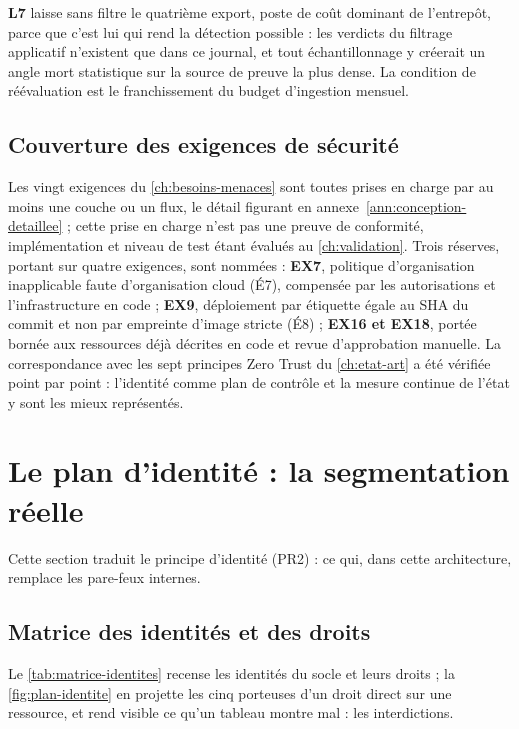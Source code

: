 \textbf{L7} laisse sans filtre le quatrième export, poste de coût dominant de l'entrepôt, parce que
c'est lui qui rend la détection possible : les verdicts du filtrage applicatif n'existent que dans ce
journal, et tout échantillonnage y créerait un angle mort statistique sur la source de preuve la plus
dense. La condition de réévaluation est le franchissement du budget d'ingestion mensuel.

\subsection{Couverture des exigences de sécurité}
\label{sec:couverture-exigences}

Les vingt exigences du \cref{ch:besoins-menaces} sont toutes prises en charge par au moins une couche ou un flux,
le détail figurant en annexe~\ref{ann:conception-detaillee} ; cette prise en charge n'est pas une
preuve de conformité, implémentation et niveau de test étant évalués au \cref{ch:validation}. Trois réserves,
portant sur quatre exigences, sont nommées : \textbf{EX7}, politique d'organisation inapplicable
faute d'organisation cloud (É7), compensée par les autorisations et l'infrastructure en code ;
\textbf{EX9}, déploiement par étiquette égale au SHA du commit et non par empreinte d'image stricte
(É8) ; \textbf{EX16 et EX18}, portée bornée aux ressources déjà décrites en code et revue
d'approbation manuelle. La correspondance avec les sept principes Zero Trust du \cref{ch:etat-art} a été
vérifiée point par point : l'identité comme plan de contrôle et la mesure continue de l'état y sont
les mieux représentés.

\section{Le plan d'identité : la segmentation réelle}
\label{sec:plan-identite}

Cette section traduit le principe d'identité (PR2) : ce qui, dans cette architecture, remplace les
pare-feux internes.

\subsection{Matrice des identités et des droits}

Le \cref{tab:matrice-identites} recense les identités du socle et leurs droits ; la
\cref{fig:plan-identite} en projette les cinq porteuses d'un droit direct sur une ressource,
et rend visible ce qu'un tableau montre mal : les interdictions.


